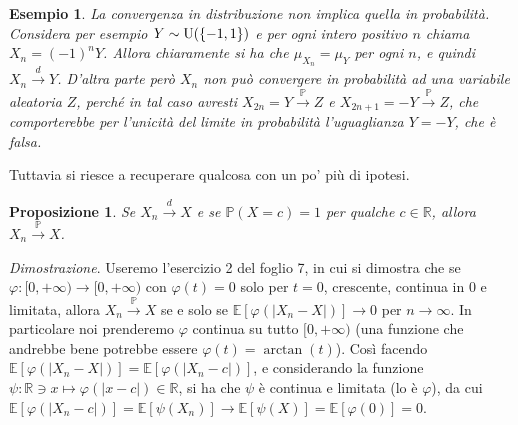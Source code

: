 \documentclass[11pt]{book}
\makeatletter
\theoremstyle{Definizione}
\theoremstyle{TeoremaProposizioneLemmaCorollario}
\newtheorem{mypropo}[myteo]{Proposizione}
\theoremstyle{OsservazioneNota}
\newtheorem{myes}{Esempio}[section]
\renewenvironment{proof}[1][\proofname]{\par
  \normalfont \topsep6\p@\@plus6\p@\relax
  \trivlist
  \item[\hskip\labelsep
        \itshape
    #1\@addpunct{.}]\ignorespaces
}{%
  \endtrivlist\@endpefalse
}
\newcommand{\R}{\mathbb{R}}
\renewcommand{\P}{\mathbb{P}}
\newcommand{\E}{\mathbb{E}}
\newcommand{\toP}{\overset{\P}{\to}}
\newcommand{\tod}{\overset{d}{\to}}
\renewenvironment{proof}{\textsl{Dimostrazione}.}{}
\makeatother
\begin{document}
\begin{myes}
La convergenza in distribuzione non implica quella in probabilità. Considera per esempio $Y \sim \textup{U}(\{-1,1\})$ e per ogni intero positivo $n$ chiama $X_n = (-1)^n Y$. Allora chiaramente si ha che $\mu_{X_n} = \mu_Y$ per ogni $n$, e quindi $X_n \tod Y$. D'altra parte però $X_n$ non può convergere in probabilità ad una variabile aleatoria $Z$, perché in tal caso avresti $X_{2n} = Y \toP Z$ e $X_{2n+1} = -Y \toP Z$, che comporterebbe per l'unicità del limite in probabilità l'uguaglianza $Y = -Y$, che è falsa.
\end{myes}
Tuttavia si riesce a recuperare qualcosa con un po' più di ipotesi.
\begin{boxpro}
\begin{mypropo}
Se $X_n \tod X$ e se $\P(X = c) = 1$ per qualche $c\in \R$, allora $X_n \toP X$.
\end{mypropo}
\tcblower
\begin{proof}
Useremo l'esercizio 2 del foglio 7, in cui si dimostra che se $\varphi:[0,+\infty) \longrightarrow [0,+\infty)$ con $\varphi(t) = 0$ solo per $t = 0$, crescente, continua in $0$ e limitata, allora $X_n \toP X$ se e solo se $\E[\varphi(|X_n-X|) ]\to 0$ per $n\to \infty$. In particolare noi prenderemo $\varphi$ continua su tutto $[0,+\infty)$ (una funzione che andrebbe bene potrebbe essere $\varphi(t) = \arctan(t)$). Così facendo $\E[\varphi(|X_n-X|)] = \E[\varphi(|X_n-c|)]$, e considerando la funzione $\psi:\R \ni x \longmapsto \varphi(|x-c|)\in \R$, si ha che $\psi$ è continua e limitata (lo è $\varphi$), da cui $\E[\varphi(|X_n-c|)] = \E[\psi(X_n)] \to \E[\psi(X)] = \E[\varphi(0)] = 0$.
\end{proof}
\end{boxpro}
\end{document}
